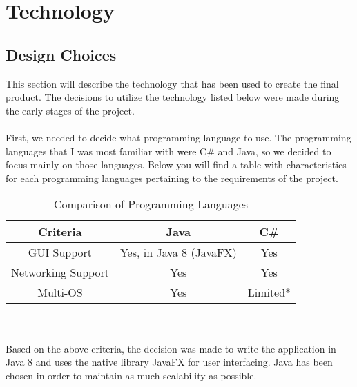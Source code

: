 \documentclass[11pt,a4paper]{article}
\begin{document}

\section{Technology}
\subsection{Design Choices}
This section will describe the technology that has been used to create the final product. The decisions to utilize the technology listed below were made during the early stages of the project.\\\\
First, we needed to decide what programming language to use. The programming languages that %
I was most familiar with were C\# and Java, so we decided to focus mainly on those languages. Below you will find a table with characteristics for each programming languages pertaining to the requirements of the project.
\begin{table}[h]
	\begin{center}
		\begin{tabular}{| c || c | c |}
			\hline
			Criteria & Java & C\# \\ \hline
			GUI Support & Yes, in Java 8 (JavaFX) & Yes \\ \hline
			Networking Support & Yes & Yes \\ \hline
			Multi-OS & Yes & Limited* \\ \hline
		\end{tabular}
		\caption{Comparison of Programming Languages}
	\end{center}
\end{table}\\\\
Based on the above criteria, the decision was made to write the application in Java 8 and uses the native library JavaFX for user interfacing. Java has been chosen in order to maintain as much scalability as possible.
\end{document}
